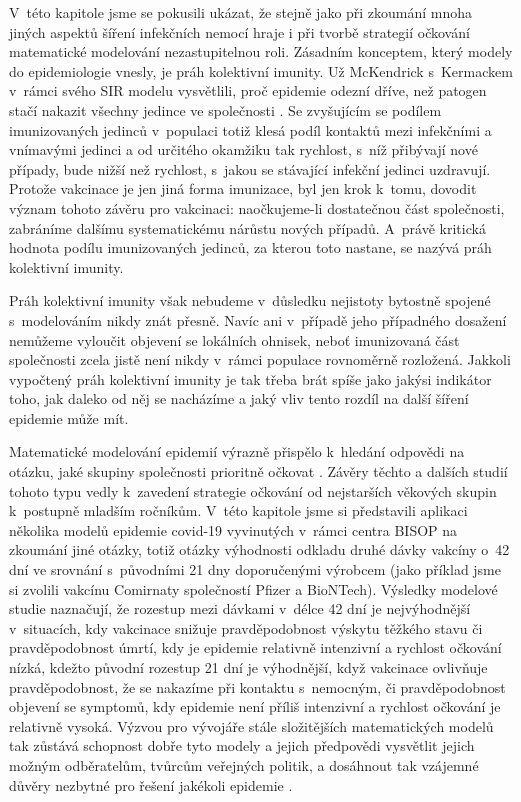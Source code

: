 V~této kapitole jsme se pokusili ukázat, že stejně jako při zkoumání mnoha jiných aspektů šíření infekčních nemocí hraje i při tvorbě strategií očkování matematické modelování nezastupitelnou roli. Zásadním konceptem, který modely do epidemiologie vnesly, je práh kolektivní imunity. Už McKendrick s~Kermackem v~rámci svého SIR modelu vysvětlili, proč epidemie odezní dříve, než patogen stačí nakazit všechny jedince ve společnosti \cite[viz také kapitolu \ref{Typy_modelu}]{Bacaer2011}. Se zvyšujícím se podílem imunizovaných jedinců v~populaci totiž klesá podíl kontaktů mezi infekčními a vnímavými jedinci a od určitého okamžiku tak rychlost, s~níž přibývají nové případy, bude nižší než rychlost, s~jakou se stávající infekční jedinci uzdravují. Protože vakcinace je jen jiná forma imunizace, byl jen krok k~tomu, dovodit význam tohoto závěru pro vakcinaci: naočkujeme-li dostatečnou část společnosti, zabráníme dalšímu systematickému nárůstu nových případů. A~právě kritická hodnota podílu imunizovaných jedinců, za kterou toto nastane, se nazývá práh kolektivní imunity.

Práh kolektivní imunity však nebudeme v~důsledku nejistoty bytostně spojené s~modelováním nikdy znát přesně. Navíc ani v~případě jeho případného dosažení nemůžeme vyloučit objevení se lokálních ohnisek, neboť imunizovaná část společnosti zcela jistě není nikdy v~rámci populace rovnoměrně rozložená. Jakkoli vypočtený práh kolektivní imunity je tak třeba brát spíše jako jakýsi indikátor toho, jak daleko od něj se nacházíme a jaký vliv tento rozdíl na další šíření epidemie může mít. 

Matematické modelování epidemií výrazně přispělo k~hledání odpovědi na otázku, jaké skupiny společnosti prioritně očkovat \cite{Bubar_etal2021,Moore_etal2021b}. Závěry těchto a dalších studií tohoto typu vedly k~zavedení strategie očkování od nejstarších věkových skupin k~postupně mladším ročníkům. V~této kapitole jsme si představili aplikaci několika modelů epidemie covid-19 vyvinutých v~rámci centra BISOP na zkoumání jiné otázky, totiž otázky výhodnosti odkladu druhé dávky vakcíny o~42 dní ve srovnání s~původními 21 dny doporučenými výrobcem (jako příklad jsme si zvolili vakcínu Comirnaty společností Pfizer a BioNTech). Výsledky modelové studie naznačují, že rozestup mezi dávkami v~délce 42 dní je nejvýhodnější v~situacích, kdy vakcinace snižuje pravděpodobnost výskytu těžkého stavu či pravděpodobnost úmrtí, kdy je epidemie relativně intenzivní a rychlost očkování nízká, kdežto původní rozestup 21 dní je výhodnější, když vakcinace ovlivňuje pravděpodobnost, že se nakazíme při kontaktu s~nemocným, či pravděpodobnost objevení se symptomů, kdy epidemie není příliš intenzivní a rychlost očkování je relativně vysoká. Výzvou pro vývojáře stále složitějších matematických modelů tak zůstává schopnost dobře tyto modely a jejich předpovědi vysvětlit jejich možným odběratelům, tvůrcům veřejných politik, a dosáhnout tak vzájemné důvěry nezbytné pro řešení jakékoli epidemie \cite{BasuAndrews2013}.

